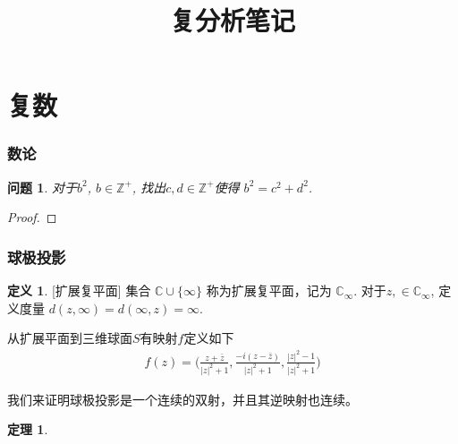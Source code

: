 \documentclass{ctexart}
\title{复分析笔记}
\newtheorem{question}{问题} %
\newtheorem{Theorem}{定理}[section]
\theoremstyle{definition}
\newtheorem{Definition}{定义}[section]
\begin{document}
\tableofcontents 

\part{复数}
\section*{数论}
\begin{question} 对于$b^2$, $b\in \mathbb{Z^{+}}$, 找出$c,d\in \mathbb{Z}^{+}$使得 $b^2=c^2+d^2$. 
 \end{question}
\begin{proof}  \end{proof}
\section*{球极投影}
\begin{Definition}{}[扩展复平面] 集合
    \(\mathbb{C}\cup \{\infty \}\) 称为扩展复平面，记为
    \(\mathbb{C}_{\infty}\). 对于$z,\in \mathbb{C}_{\infty}$, 定义度量 \(d(z,\infty)=d(\infty,z)=\infty\).  
\end{Definition}
从扩展平面到三维球面\(S\)有映射\(f\)定义如下
\begin{align}
    f(z)=\bigg(\frac{z+\bar{z}}{|z|^2+1} , \frac{-i(z-\bar{z})}{|z|^2+1}, \frac{|z|^2-1}{|z|^2+1}\bigg)
\end{align}

我们来证明球极投影是一个连续的双射，并且其逆映射也连续。

\begin{Theorem}{}{  }

\end{Theorem}
\end{document}

